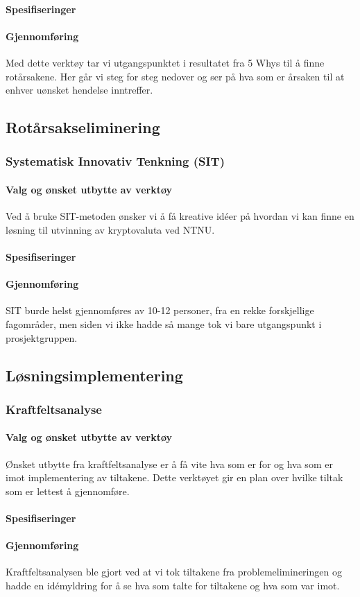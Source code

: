 \paragraph{Spesifiseringer}


\paragraph{Gjennomføring}
Med dette verktøy tar vi utgangspunktet i resultatet fra 5 Whys til å finne rotårsakene. Her går vi steg for steg nedover og ser på hva som er årsaken til at enhver uønsket hendelse inntreffer.


\subsection{Rotårsakseliminering}
\subsubsection{Systematisk Innovativ Tenkning (SIT)}

\paragraph{Valg og ønsket utbytte av verktøy}
Ved å bruke SIT-metoden ønsker vi å få kreative idéer på hvordan vi kan finne en løsning til utvinning av kryptovaluta ved NTNU. 

\paragraph{Spesifiseringer}


\paragraph{Gjennomføring}
SIT burde helst gjennomføres av 10-12 personer, fra en rekke forskjellige fagområder, men siden vi ikke hadde så mange tok vi bare utgangspunkt i prosjektgruppen.


\subsection{Løsningsimplementering}
\subsubsection{Kraftfeltsanalyse}

\paragraph{Valg og ønsket utbytte av verktøy}
Ønsket utbytte fra kraftfeltsanalyse er å få vite hva som er for og hva som er imot implementering av tiltakene. Dette verktøyet gir en plan over hvilke tiltak som er lettest å gjennomføre.

\paragraph{Spesifiseringer}


\paragraph{Gjennomføring}
Kraftfeltsanalysen ble gjort ved at vi tok tiltakene fra problemelimineringen og hadde en idémyldring for å se hva som talte for tiltakene og hva som var imot. 

